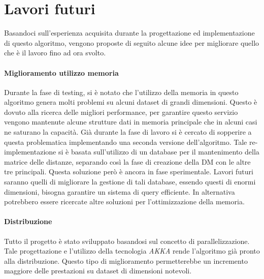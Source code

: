 \section{Lavori futuri}
Basandoci sull'esperienza acquisita durante la progettazione ed implementazione di questo algoritmo, vengono proposte di seguito alcune idee per migliorare quello che è il lavoro fino ad ora svolto.
\paragraph{Miglioramento utilizzo memoria}
Durante la fase di testing, si è notato che l'utilizzo della memoria in questo algoritmo genera molti problemi su alcuni dataset di grandi dimensioni. Questo è dovuto alla ricerca delle migliori performance, per garantire questo servizio vengono mantenute alcune strutture dati in memoria principale che in alcuni casi ne saturano la capacità. Già durante la fase di lavoro si è cercato di sopperire a questa problematica implementando una seconda versione dell'algoritmo. Tale re-implementazione si è basata sull'utilizzo di un database per il mantenimento della matrice delle distanze, separando così la fase di creazione della DM con le altre tre principali.
Questa soluzione però è ancora in fase sperimentale. Lavori futuri saranno quelli di migliorare la gestione di tali database, essendo questi di enormi dimensioni, bisogna garantire un sistema di query efficiente.
In alternativa potrebbero essere ricercate altre soluzioni per l'ottimizzazione della memoria.
\paragraph{Distribuzione}
Tutto il progetto è stato sviluppato basandosi sul concetto di parallelizzazione. Tale progettazione e l'utilizzo della tecnologia \emph{AKKA} rende l'algoritmo già pronto alla distribuzione. Questo tipo di miglioramento permetterebbe un incremento maggiore delle prestazioni su dataset di dimensioni notevoli.